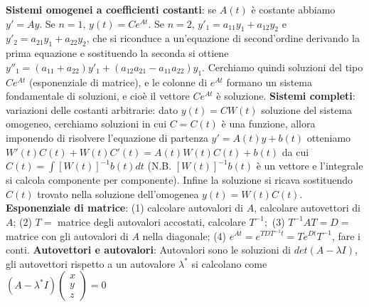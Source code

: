 \documentclass[fontsize=8pt]{scrartcl}
\begin{document}
\begin{multicols*}{4}
\textbf{Sistemi omogenei a coefficienti costanti}:\newline
se $A(t)$ è costante abbiamo $y' = Ay$.\newline
Se $n = 1$, $y(t) = Ce^{At}$.\newline
Se $n = 2$, $y'_1 = a_{11} y_1 + a_{12} y_2$ e $y'_2 = a_{21} y_1 + a_{22} y_2$, che si riconduce a un'equazione di second'ordine derivando la prima equazione e sostituendo la seconda si ottiene $y''_1 = (a_{11} + a_{22}) y'_1 + (a_{12}a_{21} - a_{11} a_{22})y_1$. Cerchiamo quindi soluzioni del tipo $Ce^{At}$ (esponenziale di matrice), e le colonne di $e^{At}$ formano un sistema fondamentale di soluzioni, e cioè il vettore $Ce^{At}$ è soluzione.\newline
\textbf{Sistemi completi}:\newline
variazioni delle costanti arbitrarie: dato $y(t) = C W(t)$ soluzione del sistema omogeneo, cerchiamo soluzioni in cui $C =C(t)$ è una funzione, allora imponendo di risolvere l'equazione di partenza $y' = A(t) y + b(t)$ otteniamo $W'(t) C(t) + W(t) C'(t) = A(t) W(t) C(t) + b(t)$ da cui $C(t) = \int [W(t)]^{-1} b(t) dt$ (N.B. $[W(t)]^{-1} b(t)$ è un vettore e l'integrale si calcola componente per componente). Infine la soluzione si ricava sostituendo $C(t)$ trovato nella soluzione dell'omogenea $y(t) = W(t) C(t)$. \newline
\textbf{Esponenziale di matrice}:\newline
(1) calcolare autovalori di $A$, calcolare autovettori di $A$;\newline
(2) $T =$ matrice degli autovalori accostati, calcolare $T^{-1};$\newline
(3) $T^{-1}AT= D =$ matrice con gli autovalori di $A$ nella diagonale;\newline
(4) $e^{At} = e^{TDT^{-1} t} = Te^{Dt} T^{-1}$, fare i conti.\newline
\textbf{Autovettori e autovalori}:\newline
Autovalori sono le soluzioni di $det(A-\lambda I)$, gli autovettori rispetto a un autovalore $\lambda^*$ si calcolano come $(A-\lambda^* I) \left(\begin{matrix}
    x \\ y \\ z
\end{matrix}\right) = 0$

\end{multicols*}
\end{document}
